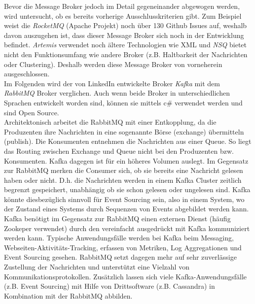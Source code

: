 {Bevor die Message Broker jedoch im Detail gegeneinander abgewogen werden, wird untersucht, ob es bereits vorherige Ausschlusskriterien gibt. Zum Beispiel weist die \textit{RocketMQ} (Apache Projekt) noch über 130 Github Issues auf, weshalb davon auszugehen ist, dass dieser Message Broker sich noch in der Entwicklung befindet. \textit{Artemis} verwendet noch ältere Technologien wie XML und \textit{NSQ} bietet nicht den Funktionsumfang wie andere Broker (z.B. Haltbarkeit der Nachrichten oder Clustering).\cite{messageQueue2018} Deshalb werden diese Message Broker von vorneherein ausgeschlossen. \\ %

Im Folgenden wird der von LinkedIn entwickelte Broker \textit{Kafka} mit dem \textit{RabbitMQ} Broker verglichen. Auch wenn beide Broker in unterschiedlichen Sprachen entwickelt worden sind, können sie mittels c\# verwendet werden und sind Open Source.\\

Architektonisch arbeitet die RabbitMQ mit einer Entkopplung, da die Produzenten ihre Nachrichten in eine sogenannte Börse (exchange) übermitteln (publish). Die Konsumenten entnehmen die Nachrichten aus einer Queue. So liegt das Routing zwischen Exchange und Queue nicht bei den Produzenten bzw. Konsumenten. Kafka dagegen ist für ein höheres Volumen auslegt. Im Gegensatz zur RabbitMQ merken die Consumer sich, ob sie bereits eine Nachricht gelesen haben oder nicht. D.h. die Nachrichten werden in einem Kafka Cluster zeitlich begrenzt gespeichert, unabhängig ob sie schon gelesen oder ungelesen sind. Kafka könnte diesbezüglich sinnvoll für Event Sourcing sein, also in einem System, wo der Zustand eines Systems durch Sequenzen von Events abgebildet werden kann.\cite{richardson2019mic_pattern} Kafka benötigt im Gegensatz zur RabbitMQ einen externen Dienst (häufig Zookeper verwendet) durch den vereinfacht ausgedrückt mit Kafka kommuniziert werden kann.\cite{understandingRabbitMQApacheKafka}\cite{kafkaUseCases} Typische Anwendungsfälle werden bei Kafka beim Messaging, Webseiten-Aktivitäts-Tracking, erfassen von Metriken, Log Aggregationen und Event Sourcing gesehen.\cite{kafkaUseCases} RabbitMQ setzt dagegen mehr auf sehr zuverlässige Zustellung der Nachrichten und unterstützt eine Vielzahl von Kommunikationsprotokollen. Zusätzlich lassen sich viele Kafka-Anwendungsfälle (z.B. Event Sourcing) mit Hilfe von Drittsoftware (z.B. Cassandra) in Kombination mit der RabbitMQ abbilden.\cite{understandingRabbitMQApacheKafka}\\

}

